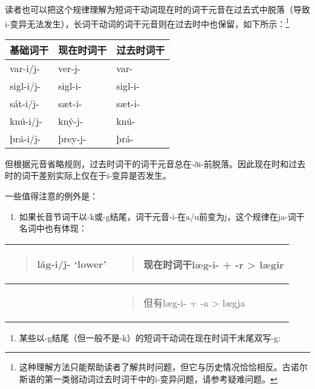 读者也可以把这个规律理解为短词干动词现在时的词干元音在过去式中脱落（导致i-变异无法发生），长词干动词的词干元音则在过去时中也保留，如下所示：\footnote{这种理解方法只能帮助读者了解共时问题，但它与历史情况恰恰相反。古诺尔斯语的第一类弱动词过去时词干中的i-变异问题，请参考疑难问题。}

\begin{longtable}{lll}
\toprule
基础词干 & 现在时词干 & 过去时词干 \\
\midrule
\endhead
\bottomrule
\endfoot
var-i/j- & ver-j- & var- \\
sigl-i/j- & sigl-i- & sigl-i- \\
sát-i/j- & sæt-i- & sæt-i- \\
knú-i/j- & kný-j- & knú- \\
þrá-i/j- & þrey-j- & þrá- \\
\end{longtable}

但根据元音省略规则，过去时词干的词干元音总在-ði-前脱落。因此现在时和过去时的词干差别实际上仅在于i-变异是否发生。

一些值得注意的例外是：

\begin{enumerate}
\def\labelenumi{\arabic{enumi})}
\item
  如果长音节词干以-k或-g结尾，词干元音-i-在a/u前变为j，这个规律在ja-词干名词中也有体现：
\end{enumerate}

\begin{longtable}{ll}
\toprule
\begin{quote}lág-i/j- `lower‌'\end{quote} & \begin{quote}现在时词干læg-i- + -r \textgreater{} lægir\end{quote} \\
\midrule
\endhead
\bottomrule
\endfoot
& \begin{minipage}[t]{\linewidth}\raggedright
\begin{quote}
但有læg-i- + -a \textgreater{} lægja
\end{quote}
\end{minipage} \\
\end{longtable}

\begin{enumerate}
\def\labelenumi{\arabic{enumi})}
\setcounter{enumi}{1}
\item
  某些以-g结尾（但一般不是-k）的短词干动词在现在时词干末尾双写-g:
\end{enumerate}

